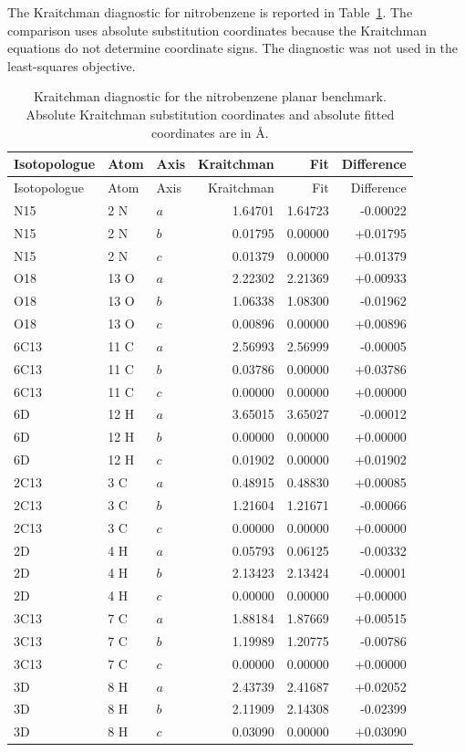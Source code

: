 \documentclass[12pt]{article}
\begin{document}
The Kraitchman diagnostic for nitrobenzene is reported in
Table~\ref{tab:si-nitrobenzene-kraitchman}. The comparison uses absolute
substitution coordinates because the Kraitchman equations do not determine
coordinate signs. The diagnostic was not used in the least-squares objective.

\begin{longtable}{lllrrr}
\caption{Kraitchman diagnostic for the nitrobenzene planar benchmark. Absolute Kraitchman substitution coordinates and absolute fitted coordinates are in \AA.}\label{tab:si-nitrobenzene-kraitchman}\\
\toprule
Isotopologue & Atom & Axis & Kraitchman & Fit & Difference \\
\midrule
\endfirsthead
\toprule
Isotopologue & Atom & Axis & Kraitchman & Fit & Difference \\
\midrule
\endhead
N15 & 2 N & $a$ & 1.64701 & 1.64723 & -0.00022 \\
N15 & 2 N & $b$ & 0.01795 & 0.00000 & +0.01795 \\
N15 & 2 N & $c$ & 0.01379 & 0.00000 & +0.01379 \\
O18 & 13 O & $a$ & 2.22302 & 2.21369 & +0.00933 \\
O18 & 13 O & $b$ & 1.06338 & 1.08300 & -0.01962 \\
O18 & 13 O & $c$ & 0.00896 & 0.00000 & +0.00896 \\
6C13 & 11 C & $a$ & 2.56993 & 2.56999 & -0.00005 \\
6C13 & 11 C & $b$ & 0.03786 & 0.00000 & +0.03786 \\
6C13 & 11 C & $c$ & 0.00000 & 0.00000 & +0.00000 \\
6D & 12 H & $a$ & 3.65015 & 3.65027 & -0.00012 \\
6D & 12 H & $b$ & 0.00000 & 0.00000 & +0.00000 \\
6D & 12 H & $c$ & 0.01902 & 0.00000 & +0.01902 \\
2C13 & 3 C & $a$ & 0.48915 & 0.48830 & +0.00085 \\
2C13 & 3 C & $b$ & 1.21604 & 1.21671 & -0.00066 \\
2C13 & 3 C & $c$ & 0.00000 & 0.00000 & +0.00000 \\
2D & 4 H & $a$ & 0.05793 & 0.06125 & -0.00332 \\
2D & 4 H & $b$ & 2.13423 & 2.13424 & -0.00001 \\
2D & 4 H & $c$ & 0.00000 & 0.00000 & +0.00000 \\
3C13 & 7 C & $a$ & 1.88184 & 1.87669 & +0.00515 \\
3C13 & 7 C & $b$ & 1.19989 & 1.20775 & -0.00786 \\
3C13 & 7 C & $c$ & 0.00000 & 0.00000 & +0.00000 \\
3D & 8 H & $a$ & 2.43739 & 2.41687 & +0.02052 \\
3D & 8 H & $b$ & 2.11909 & 2.14308 & -0.02399 \\
3D & 8 H & $c$ & 0.03090 & 0.00000 & +0.03090 \\
\bottomrule
\end{longtable}
\end{document}
